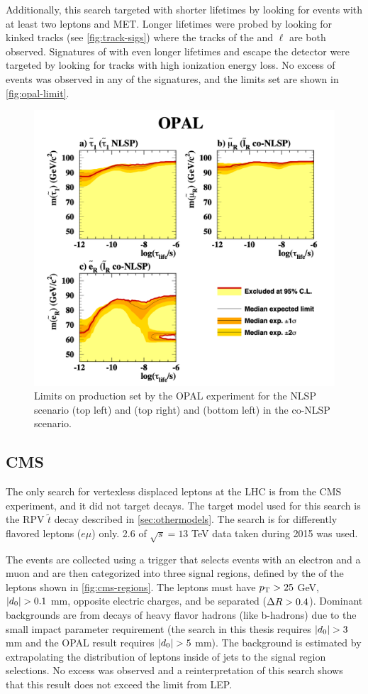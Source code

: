 Additionally, this search targeted \slep with shorter lifetimes by looking for events with at least two leptons and \ac{MET}. Longer lifetimes were probed by looking for kinked tracks (see \autoref{fig:track-sigs}) where the tracks of the \slep and $\ell$ are both observed. Signatures of \slep with even longer lifetimes and escape the detector were targeted by looking for tracks with high ionization energy loss. No excess of events was observed in any of the signatures, and the limits set are shown in \autoref{fig:opal-limit}.


\begin{figure}[!h]
\centering
\includegraphics[width=.6\textwidth]{figures/theory/opal-limit.png}
\caption{Limits on \slep production set by the OPAL experiment for the \stau \ac{NLSP} scenario (top left) and \smu (top right) and \selec (bottom left) in the co-\ac{NLSP} scenario.~\cite{opal}}
\label{fig:opal-limit}
\end{figure}


\subsection{CMS}
\label{sec:cms-limit}

The only search for vertexless displaced leptons at the \ac{LHC} is from the \ac{CMS} experiment, and it did not target \slep decays. The target model used for this search is the RPV $\tilde{t}$ decay described in \autoref{sec:othermodels}. The search is for differently flavored leptons ($e\mu$) only. 2.6 \ifb of $\sqrt{s} = 13$ TeV data taken during 2015 was used.  

The events are collected using a trigger that selects events with an electron and a muon and are then categorized into three signal regions, defined by the \absdz of the leptons shown in \autoref{fig:cms-regions}. The leptons must have $p_{\text{T}} > 25$ GeV, $|d_0| > 0.1$ mm, opposite electric charges, and be separated ($\Delta R > 0.4$). Dominant backgrounds are from decays of heavy flavor hadrons (like b-hadrons) due to the small impact parameter requirement (the search in this thesis requires $|d_0| > 3$ mm and the OPAL result requires $|d_0| > 5$ mm). The background is estimated by extrapolating the \absdz distribution of leptons inside of jets to the signal region selections. No excess was observed and a reinterpretation of this search \cite{jesseshelton} shows that this result does not exceed the limit from \ac{LEP}.


